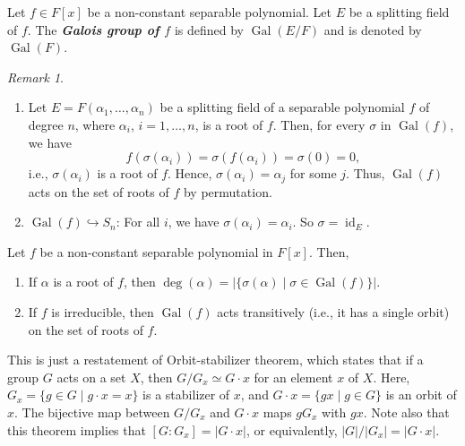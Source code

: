 \documentclass[twoside]{article}
\DeclareMathOperator\Gal{Gal}
\DeclareMathOperator\id{id}
\theoremstyle{remark}
\newtheorem*{remark}{{Remark}}
\newcounter{theorem}
\newcommand*\term[1]{\textbf{\textit{\mathversion{bold}#1}}}
\begin{document}
\begin{definition}
  Let \(f \in F[x]\) be a non-constant separable polynomial. Let \(E\) be a splitting field of \(f\). The \term{Galois group of \(f\)} is defined by \(\Gal(E/F)\) and is denoted by \(\Gal(F)\).
\end{definition}

\begin{remark}
  \begin{enumerate}[label=\textup{\arabic*.}]
    \item Let \(E = F(\alpha_1, \dots, \alpha_n)\) be a splitting field of a separable polynomial \(f\) of degree \(n\), where \(\alpha_i\), \(i = 1, \dots, n\), is a root of \(f\). Then, for every \(\sigma\) in \(\Gal(f)\), we have
    \[ f(\sigma(\alpha_i)) = \sigma(f(\alpha_i)) = \sigma(0) = 0, \]
    i.e., \(\sigma(\alpha_i)\) is a root of \(f\). Hence, \(\sigma(\alpha_i) = \alpha_j\) for some \(j\). Thus, \(\Gal(f)\) acts on the set of roots of \(f\) by permutation.
    
    \item \(\Gal(f) \hookrightarrow S_n\): For all \(i\), we have \(\sigma(\alpha_i) = \alpha_i\). So \(\sigma = \id_E\).
  \end{enumerate}
\end{remark}

\begin{lemma}
  Let \(f\) be a non-constant separable polynomial in \(F[x]\). Then,
  \begin{enumerate}[label=\textup{(\arabic*)}, nosep]
    \item If \(\alpha\) is a root of \(f\), then \(\deg(\alpha) = |\{\sigma(\alpha) \mid \sigma \in \Gal(f)\}|\).
    \item  If \(f\) is irreducible, then \(\Gal(f)\) acts transitively (i.e., it has a single orbit) on the set of roots of \(f\).
  \end{enumerate}
\end{lemma}

This is just a restatement of Orbit-stabilizer theorem, which states that if a group \(G\) acts on a set \(X\), then \(G/G_x \simeq G \cdot x\) for an element \(x\) of \(X\). Here, \(G_x = \{g \in G \mid g \cdot x = x\}\) is a stabilizer of \(x\), and \(G \cdot x = \{gx \mid g \in G\}\) is an orbit of \(x\). The bijective map between \(G/G_x\) and \(G \cdot x\) maps \(gG_x\) with \(gx\). Note also that this theorem implies that \([G:G_x] = |G \cdot x|\), or equivalently, \(|G|/|G_x| = |G \cdot x|\).
\end{document}
